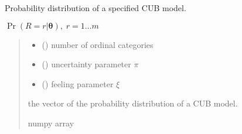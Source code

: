 \documentclass[letterpaper,10pt,english]{sphinxmanual}
\begin{document}
\begin{fulllineitems}
\label{\detokenize{cubmods:cubmods.cub.pmf}}
\pysigstartsignatures
{}
\pysigstopsignatures
\sphinxAtStartPar
Probability distribution of a specified CUB model.

\sphinxAtStartPar
\(\Pr(R = r | \pmb\theta),\; r=1 \ldots m\)
\begin{quote}\begin{description}
\begin{itemize}
\item {} 
\sphinxAtStartPar
{} () \textendash{} number of ordinal categories

\item {} 
\sphinxAtStartPar
{} () \textendash{} uncertainty parameter \(\pi\)

\item {} 
\sphinxAtStartPar
{} () \textendash{} feeling parameter \(\xi\)

\end{itemize}

\sphinxAtStartPar
the vector of the probability distribution of a CUB model.

\sphinxAtStartPar
numpy array

\end{description}\end{quote}

\end{fulllineitems}

\end{document}
